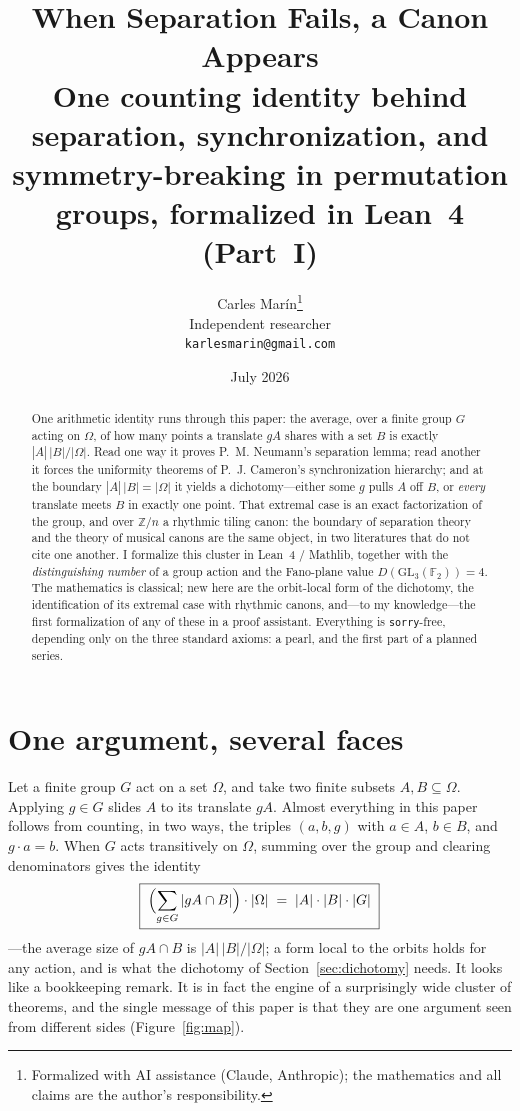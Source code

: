 \documentclass[11pt]{article}
\title{\bf When Separation Fails, a Canon Appears\\[3pt]
  \large\normalfont One counting identity behind separation, synchronization, and
  symmetry-breaking in permutation groups, formalized in Lean~4 (Part~I)}
\author{Carles Mar\'in\thanks{Formalized with AI assistance (Claude, Anthropic);
  the mathematics and all claims are the author's responsibility.}\\[3pt]
  \normalsize Independent researcher\\
  \normalsize \texttt{karlesmarin@gmail.com}}
\date{July 2026}
\newcommand{\lean}[1]{\texttt{#1}}
\newcommand{\Z}{\mathbb{Z}}
\newcommand{\GL}{\mathrm{GL}}
\begin{document}
\maketitle

\begin{abstract}
One arithmetic identity runs through this paper: the average, over a finite group
$G$ acting on $\Omega$, of how many points a translate $gA$ shares with a set $B$
is exactly $|A|\,|B|/|\Omega|$. Read one way it proves P.~M. Neumann's separation
lemma; read another it forces the uniformity theorems of P.~J. Cameron's
synchronization hierarchy; and at the boundary $|A|\,|B|=|\Omega|$ it yields a
dichotomy---either some $g$ pulls $A$ off $B$, or \emph{every} translate meets $B$
in exactly one point. That extremal case is an exact factorization of the group,
and over $\Z/n$ a rhythmic tiling canon: the boundary of separation theory and the
theory of musical canons are the same object, in two literatures that do not cite
one another. I formalize this cluster in Lean~4 / Mathlib, together with the
\emph{distinguishing number} of a group action and the Fano-plane value
$D(\GL_3(\mathbb{F}_2))=4$. The mathematics is classical; new here are the
orbit-local form of the dichotomy, the identification of its extremal case with
rhythmic canons, and---to my knowledge---the first formalization of any of these
in a proof assistant. Everything is \lean{sorry}-free, depending only on the three
standard axioms: a pearl, and the first part of a planned series.
\end{abstract}

\section{One argument, several faces}
\label{sec:intro}

Let a finite group $G$ act on a set $\Omega$, and take two finite subsets
$A,B\subseteq\Omega$. Applying $g\in G$ slides $A$ to its translate $gA$. Almost
everything in this paper follows from counting, in two ways, the triples
$(a,b,g)$ with $a\in A$, $b\in B$, and $g\cdot a=b$. When $G$ acts transitively on
$\Omega$, summing over the group and clearing denominators gives the identity
\[
  \boxed{\;\Bigl(\sum_{g\in G}|gA\cap B|\Bigr)\cdot|\Omega|
  \;=\;|A|\cdot|B|\cdot|G|\;}
\]
---the average size of $gA\cap B$ is $|A|\,|B|/|\Omega|$; a form local to the
orbits holds for any action, and is what the dichotomy of
Section~\ref{sec:dichotomy} needs. It looks like a
bookkeeping remark. It is in fact the engine of a surprisingly wide cluster of
theorems, and the single message of this paper is that they are one argument seen
from different sides (Figure~\ref{fig:map}).
\end{document}
